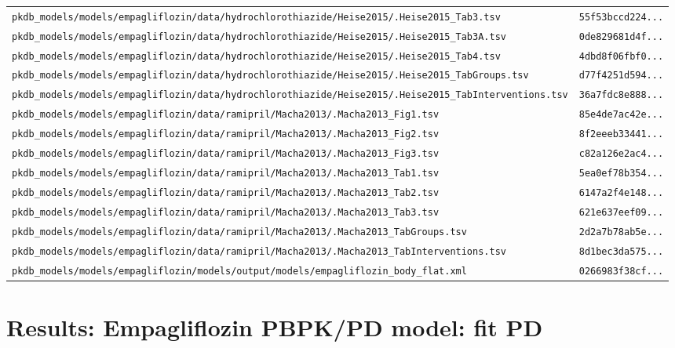 \documentclass{article}
\begin{document}
\begin{longtable}{ll}
\texttt{pkdb\_models/models/empagliflozin/data/hydrochlorothiazide/Heise2015/.Heise2015\_Tab3.tsv} & \texttt{55f53bccd224...} \\
\texttt{pkdb\_models/models/empagliflozin/data/hydrochlorothiazide/Heise2015/.Heise2015\_Tab3A.tsv} & \texttt{0de829681d4f...} \\
\texttt{pkdb\_models/models/empagliflozin/data/hydrochlorothiazide/Heise2015/.Heise2015\_Tab4.tsv} & \texttt{4dbd8f06fbf0...} \\
\texttt{pkdb\_models/models/empagliflozin/data/hydrochlorothiazide/Heise2015/.Heise2015\_TabGroups.tsv} & \texttt{d77f4251d594...} \\
\texttt{pkdb\_models/models/empagliflozin/data/hydrochlorothiazide/Heise2015/.Heise2015\_TabInterventions.tsv} & \texttt{36a7fdc8e888...} \\
\texttt{pkdb\_models/models/empagliflozin/data/ramipril/Macha2013/.Macha2013\_Fig1.tsv} & \texttt{85e4de7ac42e...} \\
\texttt{pkdb\_models/models/empagliflozin/data/ramipril/Macha2013/.Macha2013\_Fig2.tsv} & \texttt{8f2eeeb33441...} \\
\texttt{pkdb\_models/models/empagliflozin/data/ramipril/Macha2013/.Macha2013\_Fig3.tsv} & \texttt{c82a126e2ac4...} \\
\texttt{pkdb\_models/models/empagliflozin/data/ramipril/Macha2013/.Macha2013\_Tab1.tsv} & \texttt{5ea0ef78b354...} \\
\texttt{pkdb\_models/models/empagliflozin/data/ramipril/Macha2013/.Macha2013\_Tab2.tsv} & \texttt{6147a2f4e148...} \\
\texttt{pkdb\_models/models/empagliflozin/data/ramipril/Macha2013/.Macha2013\_Tab3.tsv} & \texttt{621e637eef09...} \\
\texttt{pkdb\_models/models/empagliflozin/data/ramipril/Macha2013/.Macha2013\_TabGroups.tsv} & \texttt{2d2a7b78ab5e...} \\
\texttt{pkdb\_models/models/empagliflozin/data/ramipril/Macha2013/.Macha2013\_TabInterventions.tsv} & \texttt{8d1bec3da575...} \\
\texttt{pkdb\_models/models/empagliflozin/models/output/models/empagliflozin\_body\_flat.xml} & \texttt{0266983f38cf...} \\
\end{longtable}

\section{Results: Empagliflozin PBPK/PD model: fit PD}
\end{document}
